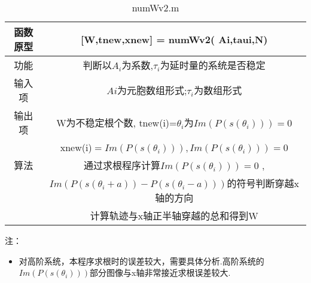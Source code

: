\documentclass[11pt,a4paper]{ctexart}
\begin{document}
\begin{table}[hbt]
\caption{numWv2.m}  %
	\label{table1}  %
	\begin{tabular}{|c|c|} 
\hline
函数原型& [W,tnew,xnew] = numWv2( Ai,taui,N) \\
\hline
功能    & 判断以$A_i$为系数,$\tau_i$为延时量的系统是否稳定\\
\hline
输入项  & $Ai$为元胞数组形式;$\tau_i$为数组形式\\
\hline
输出项  & W为不稳定根个数, tnew(i)=$\theta_i$为$Im(P(s(\theta_i)))=0$   \\
& xnew(i)$= Im(P(s(\theta_i))),Im(P(s(\theta_i)))=0$  \\
\hline
算法    & 通过求根程序计算$Im(P(s(\theta_i)))=0$ , \\
        & $Im(P(s(\theta_i+a)) -P(s(\theta_i-a)))$的符号判断穿越x轴的方向 \\
        &计算轨迹与x轴正半轴穿越的总和得到W\\ 
\hline
\end{tabular}
\end{table}
注：
\begin{itemize}
\item 对高阶系统，本程序求根时的误差较大，需要具体分析.高阶系统的$Im(P(s(\theta_i)))$部分图像与x轴非常接近求根误差较大.
\end{itemize}
\end{document}
